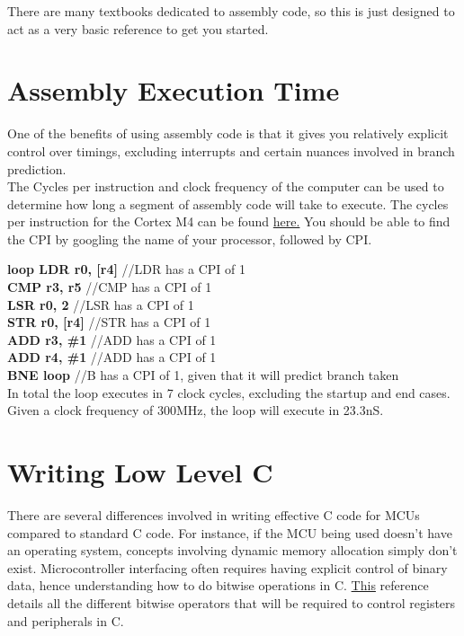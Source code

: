 \documentclass[10pt]{article}
\begin{document}
There are many textbooks dedicated to assembly code, so this is just designed to act as a very basic reference to get you started.

\section{Assembly Execution Time}
One of the benefits of using assembly code is that it gives you relatively explicit control over timings, excluding interrupts and certain nuances involved in branch prediction. \\

The Cycles per instruction and clock frequency of the computer can be used to determine how long a segment of assembly code will take to execute. The cycles per instruction for the Cortex M4 can be found \href{http://infocenter.arm.com/help/index.jsp?topic=/com.arm.doc.ddi0439b/CHDDIGAC.html}{here.} You should be able to find the CPI by googling the name of your processor, followed by CPI.

\textbf{loop    \indent    LDR r0, [r4]} //LDR has a CPI of 1 \\
\indent\indent\indent\textbf{CMP r3, r5} //CMP has a CPI of 1\\
\indent\indent\indent\textbf{LSR r0, 2} //LSR has a CPI of 1\\
\indent\indent\indent\textbf{STR r0, [r4]} //STR has a CPI of 1\\
\indent\indent\indent\textbf{ADD r3, \#1} //ADD has a CPI of 1\\
\indent\indent\indent\textbf{ADD r4, \#1} //ADD has a CPI of 1\\
\indent\indent\indent\textbf{BNE loop} //B has a CPI of 1, given that it will predict branch taken\\

In total the loop executes in 7 clock cycles, excluding the startup and end cases. Given a clock frequency of 300MHz, the loop will execute in 23.3nS.

\section{Writing Low Level C}
There are several differences involved in writing effective C code for MCUs compared to standard C code. For instance, if the MCU being used doesn't have an operating system, concepts involving dynamic memory allocation simply don't exist. Microcontroller interfacing often requires having explicit control of binary data, hence understanding how to do bitwise operations in C. \href{http://www.tutorialspoint.com/cprogramming/c_bitwise_operators.htm}{This} reference details all the different bitwise operators that will be required to control registers and peripherals in C.\\
\end{document}

